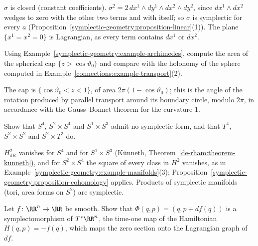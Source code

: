 \begin{solution}
$\sigma$ is closed (constant coefficients). $\sigma^2 = 2\,dx^1 \wedge dy^1 \wedge dx^2 \wedge dy^2$, since $dx^1 \wedge dx^2$ wedges to zero with the other two terms and with itself; so $\sigma$ is symplectic for
every $a$ (Proposition~\ref{symplectic-geometry:proposition-linear}(1)). The plane $\{x^1 = x^2 = 0\}$ is Lagrangian, as every term contains $dx^1$ or $dx^2$.
\end{solution}

\begin{exercise}\label{symplectic-geometry:exercise-archimedes-cap}
Using Example~\ref{symplectic-geometry:example-archimedes}, compute the area of the spherical cap $\{z > \cos\vartheta_0\}$ and compare with the holonomy of the sphere computed in
Example~\ref{connections:example-transport}(2).
\end{exercise}

\begin{solution}
The cap is $\{\cos\vartheta_0 < z < 1\}$, of area $2\pi(1 - \cos\vartheta_0)$; this is the angle of the rotation produced by parallel transport around its boundary circle, modulo $2\pi$, in accordance with the
Gauss--Bonnet theorem for the curvature $1$.
\end{solution}

\begin{exercise}\label{symplectic-geometry:exercise-not-symplectic}
Show that $S^4$, $S^2 \times S^4$ and $S^1 \times S^3$ admit no symplectic form, and that $T^4$, $S^2 \times S^2$ and $S^2 \times T^2$ do.
\end{exercise}

\begin{solution}
$H^2_{\mathrm{dR}}$ vanishes for $S^4$ and for $S^1 \times S^3$ (K\"unneth, Theorem~\ref{de-rham:theorem-kunneth}), and for $S^2 \times S^4$ the square of every class in $H^2$ vanishes, as in
Example~\ref{symplectic-geometry:example-manifolds}(3); Proposition~\ref{symplectic-geometry:proposition-cohomology} applies. Products of symplectic manifolds (tori, area forms on $S^2$) are symplectic.
\end{solution}

\begin{exercise}\label{symplectic-geometry:exercise-generating-function}
Let $f \colon \RR^n \to \RR$ be smooth. Show that $\Phi(q, p) = (q, p + df(q))$ is a symplectomorphism of $T^*\RR^n$, the time-one map of the Hamiltonian $H(q, p) = -f(q)$, which maps the zero section onto the
Lagrangian graph of $df$.
\end{exercise}

